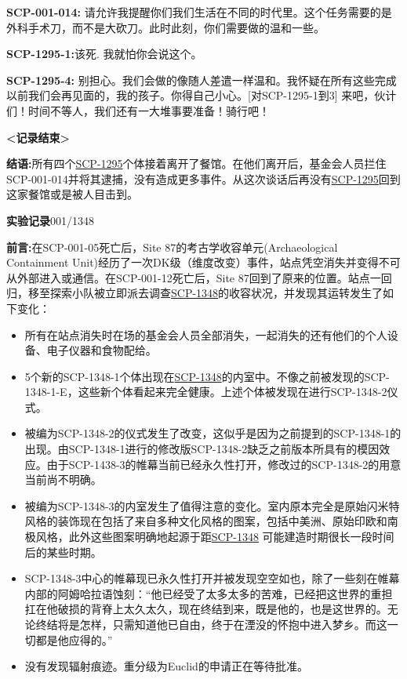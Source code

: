 \documentclass[openany,a4paper]{book} %
\begin{document}
\begin{colorboxed}
\textbf{SCP-001-014:} 请允许我提醒你们我们生活在不同的时代里。这个任务需要的是外科手术刀，而不是大砍刀。此时此刻，你们需要做的温和一些。

\textbf{SCP-1295-1:}该死. 我就怕你会说这个。

\textbf{SCP-1295-4:} 别担心。我们会做的像随人差遣一样温和。我怀疑在所有这些完成以前我们会再见面的，我的孩子。你得自己小心。[对SCP-1295-1到3] 来吧，伙计们！时间不等人，我们还有一大堆事要准备！骑行吧！

\textbf{<记录结束>}

\textbf{结语:}所有四个\hyperref[chhap:SCP-1295]{SCP-1295}个体接着离开了餐馆。在他们离开后，基金会人员拦住SCP-001-014并将其逮捕，没有造成更多事件。从这次谈话后再没有\hyperref[chhap:SCP-1295]{SCP-1295}回到这家餐馆或是被人目击到。\vspace{12pt}

\textbf{实验记录}001/1348

\textbf{前言:}在SCP-001-05死亡后，Site 87的考古学收容单元(Archaeological Containment Unit)经历了一次DK级（维度改变）事件，站点凭空消失并变得不可从外部进入或通信。在SCP-001-12死亡后，Site 87回到了原来的位置。站点一回归，移至探索小队被立即派去调查\hyperref[chhap:SCP-1348]{SCP-1348}的收容状况，并发现其运转发生了如下变化：
\begin{itemize}
  \item 所有在站点消失时在场的基金会人员全部消失，一起消失的还有他们的个人设备、电子仪器和食物配给。
  \item 5个新的SCP-1348-1个体出现在\hyperref[chhap:SCP-1348]{SCP-1348}的内室中。不像之前被发现的SCP-1348-1-E，这些新个体看起来完全健康。上述个体被发现在进行SCP-1348-2仪式。
  \item 被编为SCP-1348-2的仪式发生了改变，这似乎是因为之前提到的SCP-1348-1的出现。由SCP-1348-1进行的修改版SCP-1348-2缺乏之前版本所具有的模因效应。由于SCP-1438-3的帷幕当前已经永久性打开，修改过的SCP-1348-2的用意当前尚不明确。
  \item 被编为SCP-1348-3的内室发生了值得注意的变化。室内原本完全是原始闪米特风格的装饰现在包括了来自多种文化风格的图案，包括中美洲、原始印欧和南极风格，此外这些图案明确地起源于距\hyperref[chhap:SCP-1348]{SCP-1348} 可能建造时期很长一段时间后的某些时期。
  \item SCP-1348-3中心的帷幕现已永久性打开并被发现空空如也，除了一些刻在帷幕内部的阿姆哈拉语蚀刻：“他已经受了太多太多的苦难，已经把这世界的重担扛在他破损的背脊上太久太久，现在终结到来，既是他的，也是这世界的。无论终结将是怎样，只需知道他已自由，终于在湮没的怀抱中进入梦乡。而这一切都是他应得的。”
  \item 没有发现辐射痕迹。重分级为Euclid的申请正在等待批准。
\end{itemize}\vspace{12pt}


\end{colorboxed}
\end{document}
